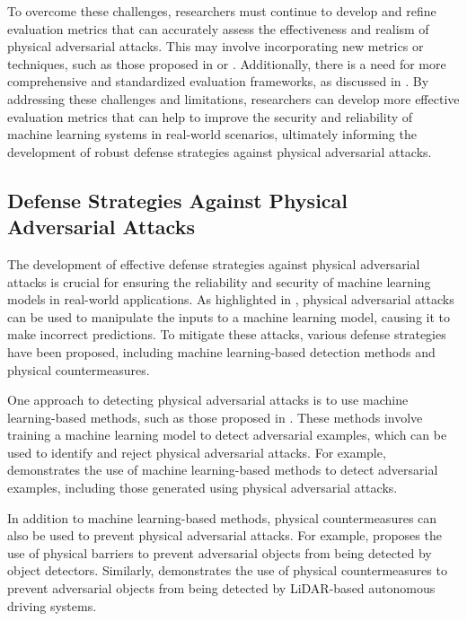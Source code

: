 \documentclass[11pt,a4paper]{article}
\begin{document}
To overcome these challenges, researchers must continue to develop and refine evaluation metrics that can accurately assess the effectiveness and realism of physical adversarial attacks. This may involve incorporating new metrics or techniques, such as those proposed in \cite{arxiv:2305.16494} or \cite{arxiv:2307.15157}. Additionally, there is a need for more comprehensive and standardized evaluation frameworks, as discussed in \cite{doi:10.1109/tpami.2025.3610085}. By addressing these challenges and limitations, researchers can develop more effective evaluation metrics that can help to improve the security and reliability of machine learning systems in real-world scenarios, ultimately informing the development of robust defense strategies against physical adversarial attacks.


\subsection{Defense Strategies Against Physical Adversarial Attacks}


The development of effective defense strategies against physical adversarial attacks is crucial for ensuring the reliability and security of machine learning models in real-world applications. As highlighted in \cite{doi:10.24963/ijcai.2021/694}, physical adversarial attacks can be used to manipulate the inputs to a machine learning model, causing it to make incorrect predictions. To mitigate these attacks, various defense strategies have been proposed, including machine learning-based detection methods and physical countermeasures.

One approach to detecting physical adversarial attacks is to use machine learning-based methods, such as those proposed in \cite{doi:10.1109/tnnls.2021.3105238}. These methods involve training a machine learning model to detect adversarial examples, which can be used to identify and reject physical adversarial attacks. For example, \cite{doi:10.1145/3128572.3140444} demonstrates the use of machine learning-based methods to detect adversarial examples, including those generated using physical adversarial attacks.

In addition to machine learning-based methods, physical countermeasures can also be used to prevent physical adversarial attacks. For example, \cite{arxiv:1807.07769} proposes the use of physical barriers to prevent adversarial objects from being detected by object detectors. Similarly, \cite{arxiv:1907.05418} demonstrates the use of physical countermeasures to prevent adversarial objects from being detected by LiDAR-based autonomous driving systems.
\end{document}
